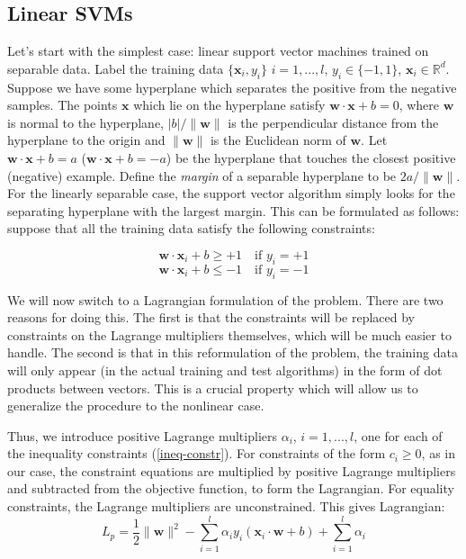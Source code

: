 \subsection{Linear SVMs}
Let's start with the simplest case: linear support vector machines trained on separable data. Label the training data $\{ \mathbf{x}_i, y_i\}$ $i=1, ..., l$, $y_i \in \{-1,1\}$, $\mathbf{x}_i \in \mathbb{R}^d$. Suppose we have some hyperplane which separates the positive from the negative samples. The points $\mathbf{x}$ which lie on the hyperplane satisfy $\mathbf{w} \cdot \mathbf{x} + b = 0$, where $\mathbf{w}$ is normal to the hyperplane, $|b|/\|\mathbf{w}\|$ is the perpendicular distance from the hyperplane to the origin and $\|\mathbf{w}\|$ is the Euclidean norm of $\mathbf{w}$. Let $\mathbf{w} \cdot \mathbf{x} +b = a$ ($\mathbf{w} \cdot \mathbf{x} +b = -a$) be the hyperplane that touches the closest positive (negative) example. Define the \textit{margin} of a separable hyperplane to be $2a / \| \mathbf{w} \|$. For the linearly separable case, the support vector algorithm simply looks for the separating hyperplane with the largest margin. This can be formulated as follows: suppose that all the training data satisfy the following constraints:

\begin{equation}
\mathbf{w} \cdot \mathbf{x}_i + b \ge +1 \quad \text{if } y_i = +1
\label{const1}
\end{equation}
\begin{equation}
\mathbf{w} \cdot \mathbf{x}_i + b \le -1 \quad \text{if } y_i = -1
\label{constr2}
\end{equation}

We will now switch to a Lagrangian formulation of the problem. There are two reasons
for doing this. The first is that the constraints will be replaced by constraints on the
Lagrange multipliers themselves, which will be much easier to handle. The second is that
in this reformulation of the problem, the training data will only appear (in the actual training
and test algorithms) in the form of dot products between vectors. This is a crucial property
which will allow us to generalize the procedure to the nonlinear case.

Thus, we introduce positive Lagrange multipliers $\alpha_i$, $i = 1, ... , l$, one for each of the
inequality constraints (\ref{ineq-constr}). For constraints of the form $c_i \ge 0$, as in our case, the
constraint equations are multiplied by positive Lagrange multipliers and subtracted from the objective function, to form the Lagrangian. For equality constraints, the Lagrange multipliers are unconstrained. This gives Lagrangian:
\begin{equation}
L_p = \frac{1}{2} \| \mathbf{w} \|^2 - \sum_{i=1}^l \alpha_i y_i (\mathbf{x}_i \cdot \mathbf{w} + b) + \sum_{i=1}^l \alpha_i
\label{Lp}
\end{equation}

